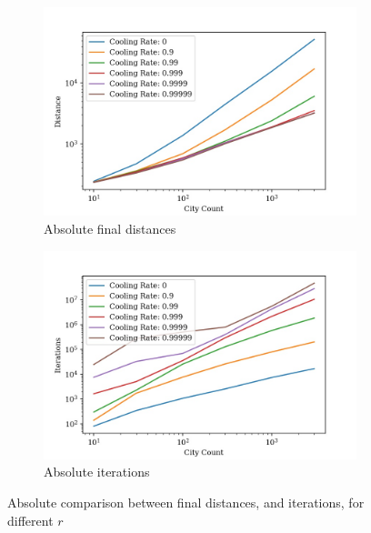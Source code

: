 \documentclass{article}
\begin{document}
\begin{figure}[H]
    \centering
    \begin{subfigure}{0.5\textwidth}
        \centering
        \includegraphics[width=1\linewidth]{images/rand_cooling_rate_city_count_distance.jpg}
        \caption{Absolute final distances}
        \label{fig:sub1}
    \end{subfigure}%
    \begin{subfigure}{0.5\textwidth}
        \centering
        \includegraphics[width=1\linewidth]{images/rand_cooling_rate_city_count_iterations.jpg}
        \caption{Absolute iterations}
        \label{fig:sub2}
    \end{subfigure}
    \captionsetup{justification=centering}
    \label{rand-cooling-rate}
    \caption{Absolute comparison between final distances, and iterations, for different $r$}
\end{figure}
\end{document}
